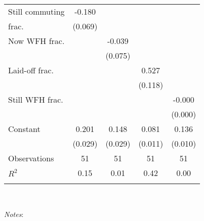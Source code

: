 \begin{table}[!htbp]
\begin{tabular}{@{\extracolsep{5pt}}lcccc}
Still commuting     &      -0.180\sym{**} &                     &                     &  \\
frac.         &     (0.069)         &                     &                     &                     \\
[1em]
Now WFH frac. &                     &      -0.039         &                     &                     \\
                    &                     &     (0.075)         &                     &                     \\
[1em]
Laid-off frac. &                     &                     &       0.527\sym{***}&                     \\
                    &                     &                     &     (0.118)         &                     \\
[1em]
Still WFH frac.     &                     &                     &                     &      -0.000         \\
                    &                     &                     &                     &     (0.000)         \\
[1em]
Constant            &       0.201\sym{***}&       0.148\sym{***}&       0.081\sym{***}&       0.136\sym{***}\\
                    &     (0.029)         &     (0.029)         &     (0.011)         &     (0.010)         \\
[1em]
Observations        &          51         &          51         &          51         &          51         \\
\(R^{2}\)           &        0.15         &        0.01         &        0.42         &        0.00         \\
\hline                  \hline \\[-1.8ex]                  \end{tabular}                 \\                 \begin{minipage}{1.0 \textwidth}                 {\footnotesize \emph{Notes}:                 \starlanguage}                 \end{minipage}                 \end{table}
